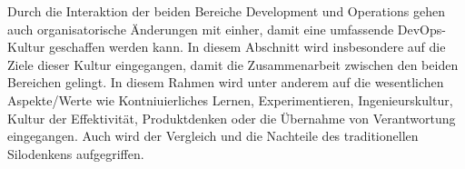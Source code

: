 Durch die Interaktion der beiden Bereiche Development und Operations gehen auch organisatorische Änderungen mit einher, damit eine umfassende DevOps-Kultur geschaffen werden kann. In diesem Abschnitt wird insbesondere auf die Ziele dieser Kultur eingegangen, damit die Zusammenarbeit zwischen den beiden Bereichen gelingt. In diesem Rahmen wird unter anderem auf die wesentlichen Aspekte/Werte wie Kontniuierliches Lernen, Experimentieren, Ingenieurskultur, Kultur der Effektivität, Produktdenken oder die Übernahme von Verantwortung eingegangen. Auch wird der Vergleich und die Nachteile des traditionellen Silodenkens aufgegriffen. 